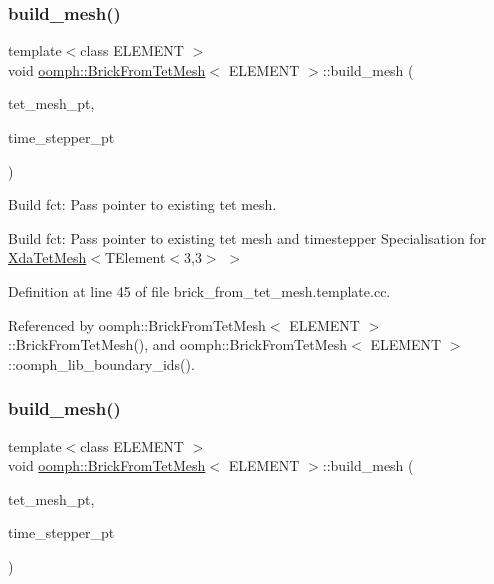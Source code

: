 \subsubsection{\texorpdfstring{build\+\_\+mesh()}{build\_mesh()}\hspace{0.1cm}{\footnotesize\ttfamily [1/2]}}
{\footnotesize\ttfamily template$<$class E\+L\+E\+M\+E\+NT $>$ \\
void \hyperlink{classoomph_1_1BrickFromTetMesh}{oomph\+::\+Brick\+From\+Tet\+Mesh}$<$ E\+L\+E\+M\+E\+NT $>$\+::build\+\_\+mesh (\begin{DoxyParamCaption}\item[{\hyperlink{classoomph_1_1XdaTetMesh}{Xda\+Tet\+Mesh}$<$ T\+Element$<$ 3, 3 $>$ $>$ $\ast$}]{tet\+\_\+mesh\+\_\+pt,  }\item[{Time\+Stepper $\ast$}]{time\+\_\+stepper\+\_\+pt }\end{DoxyParamCaption})\hspace{0.3cm}{\ttfamily [private]}}



Build fct\+: Pass pointer to existing tet mesh. 

Build fct\+: Pass pointer to existing tet mesh and timestepper Specialisation for \hyperlink{classoomph_1_1XdaTetMesh}{Xda\+Tet\+Mesh}$<$T\+Element$<$3,3$>$ $>$ 

Definition at line 45 of file brick\+\_\+from\+\_\+tet\+\_\+mesh.\+template.\+cc.



Referenced by oomph\+::\+Brick\+From\+Tet\+Mesh$<$ E\+L\+E\+M\+E\+N\+T $>$\+::\+Brick\+From\+Tet\+Mesh(), and oomph\+::\+Brick\+From\+Tet\+Mesh$<$ E\+L\+E\+M\+E\+N\+T $>$\+::oomph\+\_\+lib\+\_\+boundary\+\_\+ids().

\mbox{\label{classoomph_1_1BrickFromTetMesh_afd36d1606f796e926c61b1112b3b6117}} 
\subsubsection{\texorpdfstring{build\+\_\+mesh()}{build\_mesh()}\hspace{0.1cm}{\footnotesize\ttfamily [2/2]}}
{\footnotesize\ttfamily template$<$class E\+L\+E\+M\+E\+NT $>$ \\
void \hyperlink{classoomph_1_1BrickFromTetMesh}{oomph\+::\+Brick\+From\+Tet\+Mesh}$<$ E\+L\+E\+M\+E\+NT $>$\+::build\+\_\+mesh (\begin{DoxyParamCaption}\item[{\hyperlink{classoomph_1_1TetgenMesh}{Tetgen\+Mesh}$<$ T\+Element$<$ 3, 3 $>$ $>$ $\ast$}]{tet\+\_\+mesh\+\_\+pt,  }\item[{Time\+Stepper $\ast$}]{time\+\_\+stepper\+\_\+pt }\end{DoxyParamCaption})\hspace{0.3cm}{\ttfamily [private]}}



